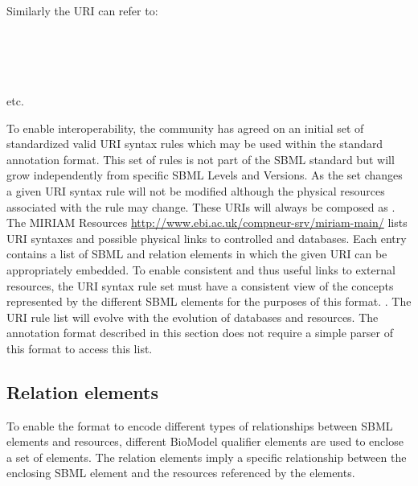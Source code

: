 Similarly the URI  can refer to:

\noindent {}\\
\noindent {}\\
\noindent {}\\
\noindent {}\\[1ex]
\noindent etc.

To enable interoperability, the community has agreed on an initial
set of standardized valid URI syntax rules which may be used
within the standard annotation format. This set of rules is not
part of the SBML standard but will grow independently from
specific SBML Levels and Versions. As the set changes\changed{,} a given URI
syntax rule will not be modified\changed{,} although the physical resources
associated with the rule may change. These URIs will always be
composed as . The MIRIAM Resources 
\url{http://www.ebi.ac.uk/compneur-srv/miriam-main/} lists URI syntaxes and
possible physical links to controlled  and databases.
Each entry contains a list of SBML and relation elements in which
the given URI can be appropriately embedded. To enable consistent
and thus useful links to external resources, the URI syntax rule
set must have a consistent view of the concepts represented by the
different SBML elements for the purposes of this format.  
 . The URI rule list will evolve with the
evolution of databases and resources. The annotation format
described in this section does not require a simple parser of this
format to access this list.


\subsection{Relation elements}
\label{sec:qualified-dc-annotation}

To enable the format to encode different types of relationships
between SBML elements and resources, different BioModel qualifier
elements are used to enclose a set of  elements. The
relation elements imply a specific relationship between the
enclosing SBML element and the resources referenced by the
 elements.

